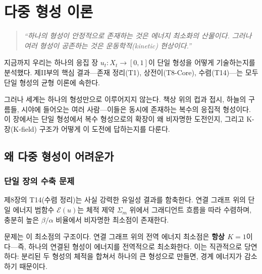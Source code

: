 
\chapter{다중 형성 이론}
\label{ch:multi-formation}

\begin{quote}
\textit{``하나의 형성이 안정적으로 존재하는 것은 에너지 최소화의 산물이다. 그러나 여러 형성이 공존하는 것은 운동학적(kinetic) 현상이다.''}
\end{quote}

\vspace{0.5em}
지금까지 우리는 하나의 응집 장 $u_t : X_t \to [0,1]$이 단일 형성을 어떻게 기술하는지를 분석했다. 제II부의 핵심 결과---존재 정리(T1), 상전이(T8-Core), 수렴(T14)---는 모두 단일 형성의 균형 이론에 속한다.

그러나 세계는 하나의 형성만으로 이루어지지 않는다. 책상 위의 컵과 접시, 하늘의 구름들, 시야에 들어오는 여러 사람---이들은 동시에 존재하는 복수의 응집적 형성이다. 이 장에서는 단일 형성에서 복수 형성으로의 확장이 왜 비자명한 도전인지, 그리고 K-장(K-field) 구조가 어떻게 이 도전에 답하는지를 다룬다.


\section{왜 다중 형성이 어려운가}
\label{sec:multi-why-hard}

\subsection{단일 장의 수축 문제}

제8장의 T14(수렴 정리)는 사실 강력한 유일성 결과를 함축한다. 연결 그래프 위의 단일 에너지 범함수 $\mathcal{E}(u)$는 체적 제약 $\Sigma_m$ 위에서 그래디언트 흐름을 따라 수렴하며, 충분히 높은 $\beta/\alpha$ 비율에서 비자명한 최소점이 존재한다.

문제는 이 최소점의 구조이다. 연결 그래프 위의 전역 에너지 최소점은 \textbf{항상 $K=1$}이다---즉, 하나의 연결된 형성이 에너지를 전역적으로 최소화한다. 이는 직관적으로 당연하다: 분리된 두 형성의 체적을 합쳐서 하나의 큰 형성으로 만들면, 경계 에너지가 감소하기 때문이다.

\begin{center}
\end{center}

